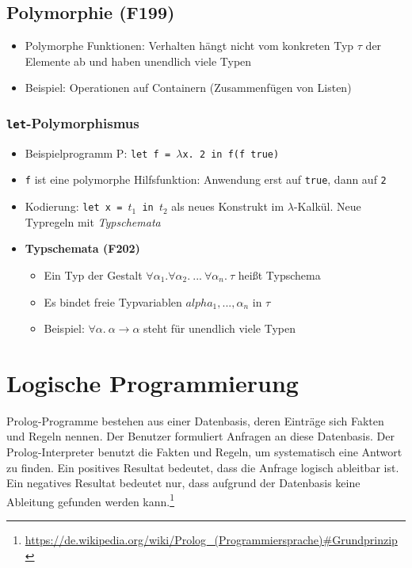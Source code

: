 \subsection{Polymorphie (F199)}
\begin{itemize}
	\item Polymorphe Funktionen: Verhalten hängt nicht vom konkreten Typ \(\tau\) der Elemente ab und haben unendlich viele Typen
	\item Beispiel: Operationen auf Containern (Zusammenfügen von Listen)
\end{itemize}

\subsubsection{\texttt{let}-Polymorphismus}
\begin{itemize}
	\item Beispielprogramm P: \texttt{let f = \(\lambda\)x. 2 in f(f true)}
	\item \texttt{f} ist eine polymorphe Hilfsfunktion: Anwendung erst auf \texttt{true}, dann auf \texttt{2}
	\item Kodierung: \texttt{let x = \(t_1\) in \(t_2\)} als neues Konstrukt im \(\lambda\)-Kalkül. Neue Typregeln mit \textit{Typschemata}
	\item \textbf{Typschemata (F202)}
	\begin{itemize}
		\item Ein Typ der Gestalt \(\forall\alpha_1.\forall\alpha_2.~...~\forall\alpha_n.~\tau\) heißt Typschema
		\item Es bindet freie Typvariablen \(alpha_1,...,\alpha_n\) in \(\tau\)
		\item Beispiel: \(\forall\alpha.~\alpha\rightarrow\alpha\) steht für unendlich viele Typen
	\end{itemize}
\end{itemize}


\section{Logische Programmierung}
Prolog-Programme bestehen aus einer Datenbasis, deren Einträge sich Fakten und Regeln nennen. Der Benutzer formuliert Anfragen an diese Datenbasis. Der Prolog-Interpreter benutzt die Fakten und Regeln, um systematisch eine Antwort zu finden. Ein positives Resultat bedeutet, dass die Anfrage logisch ableitbar ist. Ein negatives Resultat bedeutet nur, dass aufgrund der Datenbasis keine Ableitung gefunden werden kann.\footnote{\url{https://de.wikipedia.org/wiki/Prolog_(Programmiersprache)\#Grundprinzip}}

